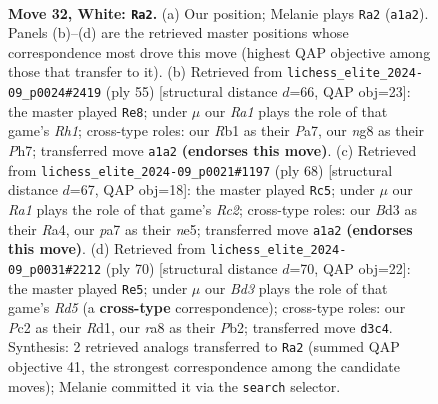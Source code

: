 \documentclass[11pt]{article}
\begin{document}
\clearpage

\begin{figure}[p]\centering
\begin{subfigure}{0.46\textwidth}\centering
\resizebox{\linewidth}{!}{%
\newchessgame
\chessboard[
  setfen={r5nr/p4k1p/2p5/b7/5B2/P2B3P/1PP2KP1/RR6 w - - 1 32},
  showmover=false,
  pgfstyle=straightmove, color=movearrow, markmove={a1-a2}
]}
\caption{}
\end{subfigure}\hfill
\begin{subfigure}{0.46\textwidth}\centering
\resizebox{\linewidth}{!}{%
\newchessgame
\chessboard[
  setfen={2k4r/p1p4p/3b2p1/8/2pP4/8/PPK2R1P/5N2 b - - 0 28},
  showmover=false,
  pgfstyle=straightmove, color=movearrow, markmove={h8-e8}
]}
\caption{}
\end{subfigure}
\\[4pt]
\begin{subfigure}{0.46\textwidth}\centering
\resizebox{\linewidth}{!}{%
\newchessgame
\chessboard[
  setfen={1b4r1/pB2k2p/7r/4np2/R7/1P2P3/P1R1KP2/8 w - - 0 35},
  showmover=false,
  pgfstyle=straightmove, color=movearrow, markmove={c2-c5}
]}
\caption{}
\end{subfigure}\hfill
\begin{subfigure}{0.46\textwidth}\centering
\resizebox{\linewidth}{!}{%
\newchessgame
\chessboard[
  setfen={5rk1/p3r1n1/8/3R3p/2N4P/1P3pP1/1P3P2/3R2K1 w - - 3 36},
  showmover=false,
  pgfstyle=straightmove, color=movearrow, markmove={d5-e5}
]}
\caption{}
\end{subfigure}
\caption{\textbf{Move 32, White: \texttt{Ra2}.} (a) Our position; Melanie plays \texttt{Ra2} (\texttt{a1a2}). Panels (b)--(d) are the retrieved master positions whose correspondence most drove this move (highest QAP objective among those that transfer to it). (b) Retrieved from \texttt{lichess\_elite\_2024-09\_p0024\#2419} (ply 55) [structural distance $d$=66, QAP obj=23]: the master played \texttt{Re8}; under $\mu$ our \emph{Ra1} plays the role of that game's \emph{Rh1}; cross-type roles: our \emph{R}b1 as their \emph{P}a7, our \emph{n}g8 as their \emph{P}h7; transferred move \texttt{a1a2} \textbf{(endorses this move)}. (c) Retrieved from \texttt{lichess\_elite\_2024-09\_p0021\#1197} (ply 68) [structural distance $d$=67, QAP obj=18]: the master played \texttt{Rc5}; under $\mu$ our \emph{Ra1} plays the role of that game's \emph{Rc2}; cross-type roles: our \emph{B}d3 as their \emph{R}a4, our \emph{p}a7 as their \emph{n}e5; transferred move \texttt{a1a2} \textbf{(endorses this move)}. (d) Retrieved from \texttt{lichess\_elite\_2024-09\_p0031\#2212} (ply 70) [structural distance $d$=70, QAP obj=22]: the master played \texttt{Re5}; under $\mu$ our \emph{Bd3} plays the role of that game's \emph{Rd5} (a \textbf{cross-type} correspondence); cross-type roles: our \emph{P}c2 as their \emph{R}d1, our \emph{r}a8 as their \emph{P}b2; transferred move \texttt{d3c4}. Synthesis: 2 retrieved analogs transferred to \texttt{Ra2} (summed QAP objective 41, the strongest correspondence among the candidate moves); Melanie committed it via the \texttt{search} selector.}
\label{fig:thought-m62}
\end{figure}
\end{document}
